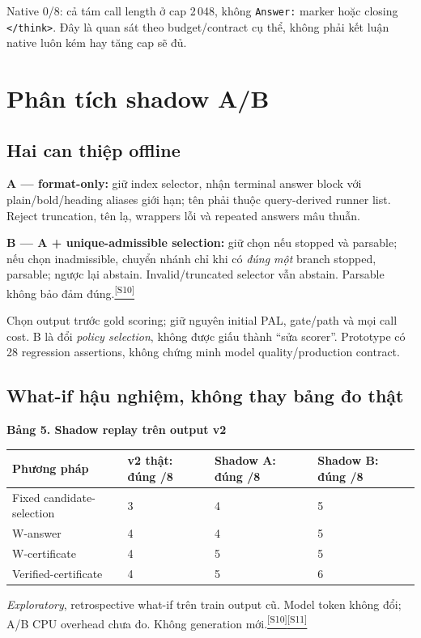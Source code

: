 \documentclass[11pt,a4paper]{article}
\newcommand{\src}[1]{\hyperlink{src-#1}{\textcolor{muted}{\textsuperscript{[S#1]}}}}
\newcommand{\exploratory}{\textit{Exploratory}}
\newcommand{\tabletitle}[1]{\par\addvspace{5pt}\Needspace{6\baselineskip}
  {\sffamily\small\bfseries #1}\par\nobreak}
\begin{document}
Native 0/8: cả tám call length ở cap 2\,048, không \texttt{Answer:} marker hoặc closing \texttt{</think>}. Đây là quan sát theo budget/contract cụ thể, không phải kết luận native luôn kém hay tăng cap sẽ đủ.

\section{Phân tích shadow A/B}
\subsection{Hai can thiệp offline}
\textbf{A --- format-only:} giữ index selector, nhận terminal answer block với plain/bold/heading aliases giới hạn; tên phải thuộc query-derived runner list. Reject truncation, tên lạ, wrappers lỗi và repeated answers mâu thuẫn.

\textbf{B --- A + unique-admissible selection:} giữ chọn nếu stopped và parsable; nếu chọn inadmissible, chuyển nhánh chỉ khi có \emph{đúng một} branch stopped, parsable; ngược lại abstain. Invalid/truncated selector vẫn abstain. Parsable không bảo đảm đúng.\src{10}

Chọn output trước gold scoring; giữ nguyên initial PAL, gate/path và mọi call cost. B là đổi \emph{policy selection}, không được giấu thành “sửa scorer”. Prototype có 28 regression assertions, không chứng minh model quality/production contract.

\subsection{What-if hậu nghiệm, không thay bảng đo thật}
\tabletitle{Bảng 5. Shadow replay trên output v2}
\begin{center}\small
\begin{tabularx}{\textwidth}{@{}YZZZ@{}}
\toprule
\textbf{Phương pháp} & \textbf{v2 thật: đúng /8} & \textbf{Shadow A: đúng /8} & \textbf{Shadow B: đúng /8}\\
\midrule
Fixed candidate-selection & 3 & 4 & 5\\
W-answer & 4 & 4 & 5\\
W-certificate & 4 & 5 & 5\\
Verified-certificate & 4 & 5 & 6\\
\bottomrule
\end{tabularx}
\end{center}
\exploratory, retrospective what-if trên train output cũ. Model token không đổi; A/B CPU overhead chưa đo. Không generation mới.\src{10}\src{11}
\end{document}
